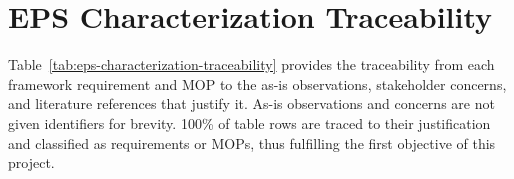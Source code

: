 \chapter{EPS Characterization Traceability}
\label{appendix:eps-characterization}

Table~\ref{tab:eps-characterization-traceability} provides the traceability from each framework requirement and MOP to the as-is observations, stakeholder concerns, and literature references that justify it.
As-is observations and concerns are not given identifiers for brevity.
100\% of table rows are traced to their justification and classified as requirements or MOPs, thus fulfilling the first objective of this project.

\begingroup
\small
\setlength{\tabcolsep}{4pt}
\setlength{\parskip}{0pt}
\setlength{\LTpre}{0.4\baselineskip}
\setlength{\LTpost}{0.4\baselineskip}
\renewcommand{\arraystretch}{1.06}
\setlength{\ReportTableBodyWidth}{\dimexpr\linewidth-4\tabcolsep\relax}
